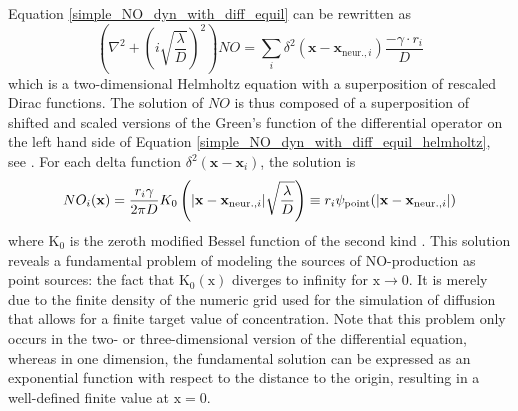 \documentclass[10pt,a4paper]{article}
\begin{document}
Equation \eqref{simple_NO_dyn_with_diff_equil} can be rewritten as
\begin{equation}
\left( \nabla^2 + \left( i\sqrt{\frac{\lambda}{D}}\right)^2\right) NO = \sum_{i} \delta^2(\mathbf{x}-\mathbf{x}_{\mathrm{ neur.},i}) \frac{- \gamma \cdot r_i}{D}
\label{simple_NO_dyn_with_diff_equil_helmholtz}
\end{equation}
which is a two-dimensional Helmholtz equation with a superposition of rescaled Dirac functions. The solution of $NO$ is thus composed of a superposition of shifted and scaled versions of the Green's function of the differential operator on the left hand side of Equation \eqref{simple_NO_dyn_with_diff_equil_helmholtz}, see \cite{EncyMath}. For each delta function $\delta^2(\mathbf{x}-\mathbf{x}_i)$, the solution is
\begin{equation}
NO_i(\mathbf{x}) = \frac{r_i \gamma}{2 \pi D} K_0 \left(|\mathbf{x}-\mathbf{x}_{\mathrm{ neur.},i}|\sqrt{\frac{\lambda}{D}} \right) \equiv r_i \psi_{\rm point}(|\mathbf{x}-\mathbf{x}_{\mathrm{ neur.},i}|)
\label{solution_diff_equil_bessel}
\end{equation}
where $\mathrm{K_0}$ is the zeroth modified Bessel function of the second kind \cite{Helmholtz_Solution_2d}. This solution reveals a fundamental problem of modeling the sources of NO-production as point sources: the fact that $\mathrm{K_0(x)}$ diverges to infinity for $\mathrm{x\rightarrow 0}$. It is merely due to the finite density of the numeric grid used for the simulation of diffusion that allows for a finite target value of concentration. Note that this problem only occurs in the two- or three-dimensional version of the differential equation, whereas in one dimension, the fundamental solution can be expressed as an exponential function with respect to the distance to the origin, resulting in a well-defined finite value at $\mathrm{x=0}$.
\end{document}
